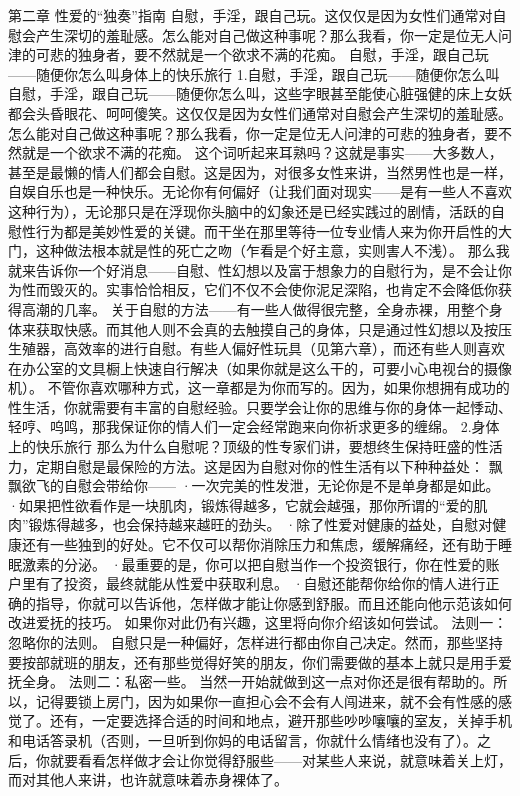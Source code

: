 \documentclass[12pt,UTF8]{ctexbook}
\begin{document}
第二章 性爱的“独奏”指南
自慰，手淫，跟自己玩。这仅仅是因为女性们通常对自慰会产生深切的羞耻感。怎么能对自己做这种事呢？那么我看，你一定是位无人问津的可悲的独身者，要不然就是一个欲求不满的花痴。
自慰，手淫，跟自己玩——随便你怎么叫身体上的快乐旅行
1.自慰，手淫，跟自己玩——随便你怎么叫
自慰，手淫，跟自己玩——随便你怎么叫，这些字眼甚至能使心脏强健的床上女妖都会头昏眼花、呵呵傻笑。这仅仅是因为女性们通常对自慰会产生深切的羞耻感。怎么能对自己做这种事呢？那么我看，你一定是位无人问津的可悲的独身者，要不然就是一个欲求不满的花痴。
这个词听起来耳熟吗？这就是事实——大多数人，甚至是最懒的情人们都会自慰。这是因为，对很多女性来讲，当然男性也是一样，自娱自乐也是一种快乐。无论你有何偏好（让我们面对现实——是有一些人不喜欢这种行为），无论那只是在浮现你头脑中的幻象还是已经实践过的剧情，活跃的自慰性行为都是美妙性爱的关键。而干坐在那里等待一位专业情人来为你开启性的大门，这种做法根本就是性的死亡之吻（乍看是个好主意，实则害人不浅）。
那么我就来告诉你一个好消息——自慰、性幻想以及富于想象力的自慰行为，是不会让你为性而毁灭的。实事恰恰相反，它们不仅不会使你泥足深陷，也肯定不会降低你获得高潮的几率。
关于自慰的方法——有一些人做得很完整，全身赤裸，用整个身体来获取快感。而其他人则不会真的去触摸自己的身体，只是通过性幻想以及按压生殖器，高效率的进行自慰。有些人偏好性玩具（见第六章），而还有些人则喜欢在办公室的文具橱上快速自行解决（如果你就是这么干的，可要小心电视台的摄像机）。
不管你喜欢哪种方式，这一章都是为你而写的。因为，如果你想拥有成功的性生活，你就需要有丰富的自慰经验。只要学会让你的思维与你的身体一起悸动、轻哼、呜鸣，那我保证你的情人们一定会经常跑来向你祈求更多的缠绵。
2.身体上的快乐旅行
那么为什么自慰呢？顶级的性专家们讲，要想终生保持旺盛的性活力，定期自慰是最保险的方法。这是因为自慰对你的性生活有以下种种益处：
飘飘欲飞的自慰会带给你——
·一次完美的性发泄，无论你是不是单身都是如此。
·如果把性欲看作是一块肌肉，锻炼得越多，它就会越强，那你所谓的“爱的肌肉”锻炼得越多，也会保持越来越旺的劲头。
·除了性爱对健康的益处，自慰对健康还有一些独到的好处。它不仅可以帮你消除压力和焦虑，缓解痛经，还有助于睡眠激素的分泌。
·最重要的是，你可以把自慰当作一个投资银行，你在性爱的账户里有了投资，最终就能从性爱中获取利息。
·自慰还能帮你给你的情人进行正确的指导，你就可以告诉他，怎样做才能让你感到舒服。而且还能向他示范该如何改进爱抚的技巧。
如果你对此仍有兴趣，这里将向你介绍该如何尝试。
法则一：忽略你的法则。
自慰只是一种偏好，怎样进行都由你自己决定。然而，那些坚持要按部就班的朋友，还有那些觉得好笑的朋友，你们需要做的基本上就只是用手爱抚全身。
法则二：私密一些。
当然一开始就做到这一点对你还是很有帮助的。所以，记得要锁上房门，因为如果你一直担心会不会有人闯进来，就不会有性感的感觉了。还有，一定要选择合适的时间和地点，避开那些吵吵嚷嚷的室友，关掉手机和电话答录机（否则，一旦听到你妈的电话留言，你就什么情绪也没有了）。之后，你就要看看怎样做才会让你觉得舒服些——对某些人来说，就意味着关上灯，而对其他人来讲，也许就意味着赤身裸体了。
\end{document}
